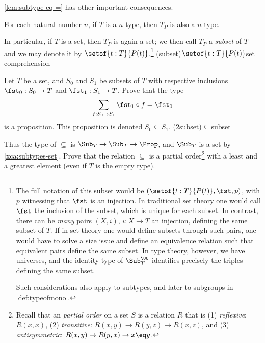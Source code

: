 \cref{lem:subtype-eq-=} has other important consequences.
\begin{corollary}\label{cor:subtype-same-level}
  For each natural number $n$,
  if $T$ is a $n$-type, then $T_P$ is also a $n$-type.
\end{corollary}
In particular, if $T$ is a set, then $T_P$ is again a set;
we then call $T_P$ a \emph{subset} of $T$ and we may denote it by
$\setof{t:T}{P(t)}$.\footnote{\label{ft:incl-vs-inj}
The full notation of this
subset would be $(\setof{t:T}{P(t)},\fst,p)$, 
with $p$ witnessing that $\fst$ is an injection.
In traditional set theory one would call $\fst$ the inclusion
of the subset, which is unique for each subset.
In contrast, there can be \emph{many} pairs $(X,i)$, $i: X\to T$ 
an injection, defining the same subset of $T$. If in set theory
one would define subsets through such pairs, one would have
to solve a size issue and define an equivalence relation
such that equivalent pairs define the same subset.
In type theory, however,
we have universes, and the identity type of $\Sub^\UU_T$ identifies
precisely the triples defining the same subset.

Such considerations also apply to subtypes, and
later to subgroups in \cref{def:typeofmono}.}
\glossary(subset){$\setof{t:T}{P(t)}$}{set comprehension}

\begin{xca}\label{xca:subsets-inclusion}
  Let $T$ be a set, and $S_0$ and $S_1$ be subsets of $T$ with respective
  inclusions $\fst_0 : S_0 \to T$ and $\fst_1 : S_1 \to T$. Prove that the type%
  \marginnote{%
    \[
      \begin{tikzcd}[ampersand replacement=\&]
        S_0 \ar[rr,dashed,"f"]\ar[dr,"{\fst_0}"'] \& \& S_1\ar[dl,"{\fst_1}"] \\
        \& T \&
      \end{tikzcd}
    \]}
  \begin{displaymath}
    \sum_{f: S_0 \to S_1} \fst_1 \circ f = \fst_0
  \end{displaymath}
  is a proposition. This proposition is denoted $S_0 \subseteq S_1$.
  \glossary(2subset){${\subseteq}$}{subset}

  Thus the type of ${\subseteq}$ is $\Sub_T\to\Sub_T\to\Prop$,
  and $\Sub_T$ is a set by \cref{xca:subtypes-set}.
  Prove that the relation ${\subseteq}$ is a partial
  order\footnote{\label{ft:partial-order}%
  Recall that an \emph{partial order} on a set $S$ is a relation $R$ that is
  (1) \emph{reflexive}: $R(x,x)$,
  (2) \emph{transitive}: $R(x,y) \to R(y,z) \to R(x,z)$, and
  (3) \emph{antisymmetric}: $R(x,y) \to R(y,x) \to x\eq y$.}
with a least and a greatest element (even if $T$ is the empty type).
\end{xca}

